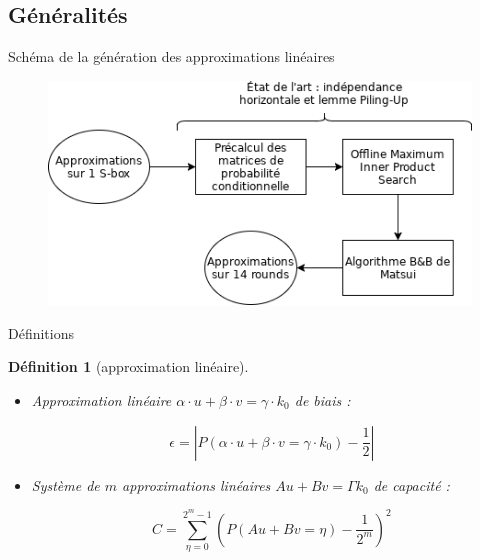 \documentclass{beamer}
\newtheorem*{defi}{Définition}
\begin{document}
\subsection{Généralités}
\begin{frame}{Schéma de la génération des approximations linéaires}
	\begin{figure}
		\centering
		\includegraphics[scale=0.6]{genscheme}
	\end{figure}
\end{frame}

\begin{frame}{Définitions}
	\begin{defi}[approximation linéaire]
	\begin{itemize}
		\item Approximation linéaire $\alpha \cdot u + \beta \cdot v=\gamma \cdot k_0$ de biais :
			
	$$\epsilon=\left|P(\alpha \cdot u + \beta \cdot v=\gamma \cdot k_0)-\frac{1}{2}\right|$$

	\item Système de $m$ approximations linéaires $Au+Bv=\Gamma k_0$ de capacité :

	$$C=\sum_{\eta=0}^{2^m-1}\left(P(Au+Bv=\eta)-\frac{1}{2^m}\right)^2$$
	\end{itemize}
	\end{defi}
\end{frame}
\end{document}
